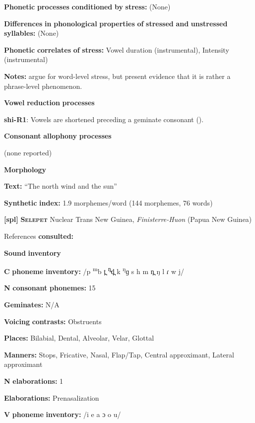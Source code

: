 \textbf{Phonetic} \textbf{processes} \textbf{conditioned} \textbf{by} \textbf{stress:} (None)

\textbf{Differences} \textbf{in} \textbf{phonological} \textbf{properties} \textbf{of} \textbf{stressed} \textbf{and} \textbf{unstressed} \textbf{syllables:} (None)

\textbf{Phonetic} \textbf{correlates} \textbf{of} \textbf{stress:} Vowel duration (instrumental), Intensity (instrumental)

\textbf{Notes:} \citet{GordonNafi2012} argue for word-level stress, but \citet{RoettgerEtAl2015} present evidence that it is rather a phrase-level phenomenon.

\textbf{Vowel} \textbf{reduction} \textbf{processes}

\textbf{shi-R1}: Vowels are shortened preceding a geminate consonant (\citealt{DellElmedlouai2002}).

\textbf{Consonant} \textbf{allophony} \textbf{processes}

(none reported)

\textbf{Morphology}

\textbf{Text:} “The north wind and the sun” \citep[219]{Ridouane2014}

\textbf{Synthetic} \textbf{index:} 1.9 morphemes/word (144 morphemes, 76 words)

\textbf{[spl]}   \textbf{\textsc{Selepet}}  Nuclear Trans New Guinea, \textit{Finisterre-Huon} (Papua New Guinea)

References \textbf{consulted:} \citet{McElhanon1970}

\textbf{Sound} \textbf{inventory}

\textbf{C} \textbf{phoneme} \textbf{inventory:} /p \textsuperscript{m}b t̪ \textsuperscript{n̪}d̪ k \textsuperscript{ŋ}ɡ s h m n̪ ŋ l ɾ w j/

\textbf{N} \textbf{consonant} \textbf{phonemes:} 15

\textbf{Geminates:} N/A

\textbf{Voicing} \textbf{contrasts:} Obstruents

\textbf{Places:} Bilabial, Dental, Alveolar, Velar, Glottal

\textbf{Manners:} Stops, Fricative, Nasal, Flap/Tap, Central approximant, Lateral approximant

\textbf{N} \textbf{elaborations:} 1

\textbf{Elaborations:} Prenasalization

\textbf{V} \textbf{phoneme} \textbf{inventory:} /i e a ɔ o u/

